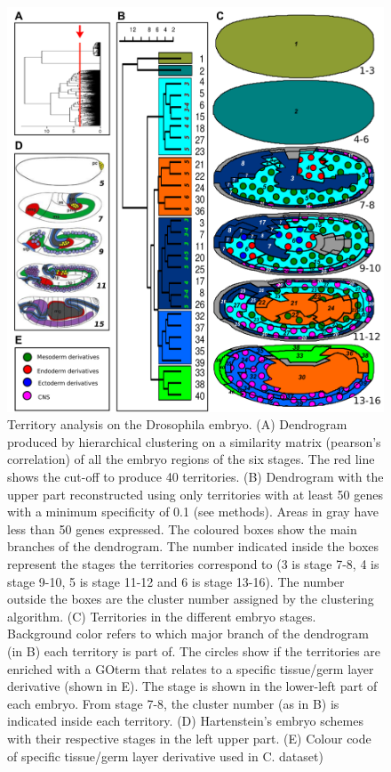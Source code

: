 \begin{figure}[h]
  \includegraphics[width=\textwidth]{./Images/Art-I/territories.png}
  \centering
  \caption{Territory analysis on the Drosophila embryo. (A) Dendrogram produced by hierarchical clustering on a similarity matrix (pearson's correlation) of all the embryo regions of the six stages. The red line shows the cut-off to produce 40 territories. (B) Dendrogram with the upper part reconstructed using only territories with at least 50 genes with a minimum specificity of 0.1 (see methods). Areas in gray have less than 50 genes expressed. The coloured boxes show the main branches of the dendrogram. The number indicated inside the boxes represent the stages the territories correspond to (3 is stage 7-8, 4 is stage 9-10, 5 is stage 11-12 and 6 is stage 13-16). The number outside the boxes are the cluster number assigned by the clustering algorithm. (C) Territories in the different embryo stages. Background color refers to which major branch of the dendrogram (in B) each territory is part of. The circles show if the territories are enriched with a GOterm that relates to a specific tissue/germ layer derivative (shown in E). The stage is shown in the lower-left part of each embryo. From stage 7-8, the cluster number (as in B) is indicated inside each territory. (D) Hartenstein's embryo schemes \citep{Hartenstein1993} with their respective stages in the left upper part. (E) Colour code of specific tissue/germ layer derivative used in C.
dataset)}
  \label{fig:Art-I-3measures}
\end{figure}
